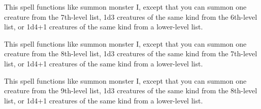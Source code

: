 \begin{multicols}{2}
\begin{small}
\noindent This spell functions like summon monster I, except that you can summon one creature from the 7th-level list, 1d3 creatures of the same kind from the 6th-level list, or 1d4+1 creatures of the same kind from a lower-level list.

\noindent This spell functions like summon monster I, except that you can summon one creature from the 8th-level list, 1d3 creatures of the same kind from the 7th-level list, or 1d4+1 creatures of the same kind from a lower-level list.

\noindent This spell functions like summon monster I, except that you can summon one creature from the 9th-level list, 1d3 creatures of the same kind from the 8th-level list, or 1d4+1 creatures of the same kind from a lower-level list.


\end{small}
\end{multicols}
